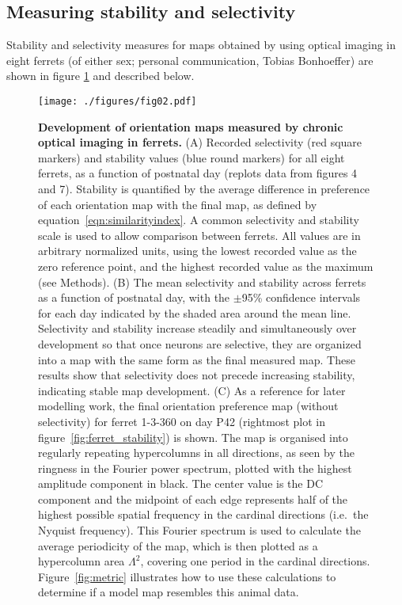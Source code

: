 \documentclass{article}
\def \scalefactor {0.666666}
\def \chapmanScale {\scalefactor}          %
\begin{document}
\subsection*{Measuring stability and selectivity}

  Stability and selectivity measures for maps obtained by
  \citet{Chapman1996} using optical imaging in eight ferrets (of
  either sex; personal communication, Tobias Bonhoeffer) are shown in
  figure \ref{fig:chapman} and described below.%
\begin{figure}
\centerline{
\texttt{[image: ./figures/fig02.pdf]}
}
\caption[]{\textbf{Development of orientation maps measured by chronic
    optical imaging in ferrets.}  (A) Recorded selectivity (red square
  markers) and stability values (blue round markers) for all eight
  ferrets, as a function of postnatal day (replots data from
  \citet{Chapman1996} figures 4 and 7).  Stability is quantified by
  the average difference in preference of each
  orientation map with the final map, as defined by
  equation~\ref{eqn:similarityindex}.  A common selectivity and
  stability scale is used to allow comparison between ferrets. All
  values are in arbitrary normalized units, using the lowest recorded
  value as the zero reference point, and the highest recorded value as
  the maximum (see Methods). (B) The mean selectivity and stability
  across ferrets as a function of postnatal day, with the $\pm$95\%
  confidence intervals for each day indicated by the shaded area
  around the mean line. Selectivity and stability increase steadily
  and simultaneously over development so that once neurons are
  selective, they are organized into a map with the same form as the
  final measured map. These results show that selectivity does not precede increasing
  stability, indicating stable map development.
  (C) As a reference for later modelling work, the final orientation
  preference map (without selectivity) for ferret 1-3-360 on day P42
  (rightmost plot in figure~\ref{fig:ferret_stability}) is shown.  The
  map is organised into regularly repeating hypercolumns in all
  directions, as seen by the ringness in the Fourier power spectrum,
  plotted with the highest amplitude component in black.
  The center value is the DC component and the midpoint of each edge
  represents half of the highest possible spatial frequency
  in the cardinal directions  (i.e.\ the Nyquist frequency).
  This Fourier spectrum is used to calculate the average periodicity
  of the map, which is then plotted as a hypercolumn area $\Lambda^2$,
  covering one period in the cardinal directions.
  Figure~\ref{fig:metric} illustrates how to use these
  calculations to determine if a model map resembles this animal data.
}
\label{fig:chapman}
\end{figure}
\end{document}
